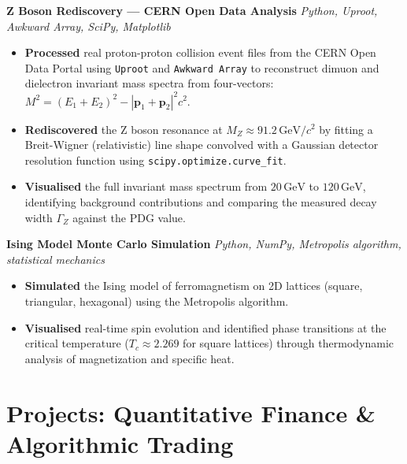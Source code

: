 \documentclass[10pt, a4paper]{article}
\newenvironment{project}[2]{%
  \textbf{\color{accent}#1} \hfill
  \small\textit{\color{light}#2}%
  \begin{itemize}%
}{%
  \end{itemize}%
  \vspace{2pt}%
}
\begin{document}
\begin{project}{Z Boson Rediscovery --- CERN Open Data Analysis}{Python, Uproot, Awkward Array, SciPy, Matplotlib}
  \item \textbf{Processed} real proton-proton collision event files from the CERN Open Data Portal
        using \texttt{Uproot} and \texttt{Awkward Array} to reconstruct dimuon and dielectron
        invariant mass spectra from four-vectors:
        $M^2 = (E_1+E_2)^2 - |\mathbf{p}_1+\mathbf{p}_2|^2c^2$.
  \item \textbf{Rediscovered} the Z boson resonance at $M_Z \approx 91.2\,\mathrm{GeV}/c^2$ by
        fitting a Breit-Wigner (relativistic) line shape convolved with a Gaussian detector
        resolution function using \texttt{scipy.optimize.curve\_fit}.
  \item \textbf{Visualised} the full invariant mass spectrum from $20\,\mathrm{GeV}$ to
        $120\,\mathrm{GeV}$, identifying background contributions and comparing the measured
        decay width $\Gamma_Z$ against the PDG value.
\end{project}

\begin{project}{Ising Model Monte Carlo Simulation}{Python, NumPy, Metropolis algorithm, statistical mechanics}
  \item \textbf{Simulated} the Ising model of ferromagnetism on 2D lattices (square, triangular, hexagonal) using the Metropolis algorithm.
  \item \textbf{Visualised} real-time spin evolution and identified phase transitions at the critical temperature ($T_c \approx 2.269$ for square lattices) through thermodynamic analysis of magnetization and specific heat.
\end{project}

\section{Projects: Quantitative Finance \& Algorithmic Trading}
\end{document}
